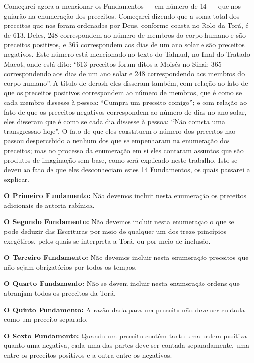 Começarei agora a mencionar os Fundamentos --- em número de 14 ---
que nos guiarão na enumeração dos preceitos. Começarei dizendo que a
soma total dos preceitos que nos foram ordenados por Deus, conforme
consta no Rolo da Torá\starr, é de 613. Deles,
248 correspondem ao número de membros do corpo
humano e são preceitos positivos, e 365
correspondem aos dias de um ano solar e são preceitos negativos. Este
número está mencionado no texto do Talmud\starr, no final do Tratado Macot\starr,
onde está dito: ``613 preceitos foram ditos a Moisés no
Sinai: 365 correspondendo aos dias de um ano
solar e 248 correspondendo aos membros do corpo
humano''. A título de derash\starr{} eles disseram
também, com relação ao fato de que os preceitos positivos correspondem
ao número de membros, que é como se cada membro dissesse à pessoa:
``Cumpra um preceito comigo''; e com relação ao fato de que os
preceitos negativos correspondem ao número de dias no ano solar, eles
disseram que é como se cada dia dissesse à pessoa: ``Não cometa uma
transgressão hoje''. O fato de que eles constituem o número dos
preceitos não passou despercebido a nenhum dos que se empenharam na
enumeração dos preceitos; mas no processo da enumeração em si eles
contaram assuntos que são produtos de imaginação sem base, como será
explicado neste trabalho. Isto se deveu ao fato de que eles
desconheciam estes 14 Fundamentos, os quais passarei a explicar.

\textbf{O Primeiro Fundamento:} Não devemos incluir nesta enumeração os
preceitos adicionais de autoria rabínica.

\textbf{O Segundo Fundamento:} Não devemos incluir nesta enumeração o
que se pode deduzir das Escrituras por meio de qualquer um dos treze
princípios exegéticos, pelos quais se interpreta a Torá\starr, ou por meio
de inclusão.

\textbf{O Terceiro Fundamento:} Não devemos incluir nesta enumeração
preceitos que não sejam obrigatórios por todos os tempos.

\textbf{O Quarto Fundamento:} Não se devem incluir nesta enumeração
ordens que abranjam todos os preceitos da Torá\starr.

\textbf{O Quinto Fundamento:} A razão dada para um preceito não deve ser
contada como um preceito separado.

\textbf{O Sexto Fundamento:} Quando um preceito contém tanto uma ordem
positiva quanto uma negativa, cada uma das partes deve ser contada
separadamente, uma entre os preceitos positivos e a outra entre os
negativos.


